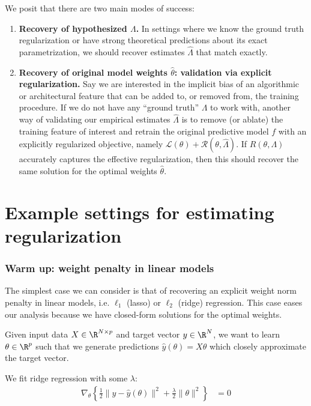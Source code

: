 \documentclass[10pt]{article}
\begin{document}
We posit that there are two main modes of success:
\begin{enumerate}
    \item \textbf{Recovery of hypothesized $\Lambda$.} In settings where we know the ground truth regularization or have strong theoretical predictions about its exact parametrization, we should recover estimates $\hat{\Lambda}$ that match exactly.
    \item \textbf{Recovery of original model weights $\hat{\theta}$: validation via explicit regularization.} Say we are interested in the implicit bias of an algorithmic or architectural feature that can be added to, or removed from, the training procedure. If we do not have any ``ground truth'' $\Lambda$ to work with, another way of validating our empirical estimates $\hat{\Lambda}$ is to remove (or ablate) the training feature of interest and retrain the original predictive model $f$ with an explicitly regularized objective, namely $\mathcal{L}(\theta) + \mathcal{R}(\theta, \hat{\Lambda})$. If $R(\theta, \Lambda)$ accurately captures the effective regularization, then this should recover the same solution for the optimal weights $\hat{\theta}$. 
\end{enumerate}

\section{Example settings for estimating regularization}
\subsubsection{Warm up: weight penalty in linear models}
The simplest case we can consider is that of recovering an explicit weight norm penalty in linear models, i.e. $\ell_1$ (lasso) or $\ell_2$ (ridge) regression. This case eases our analysis because we have closed-form solutions for the optimal weights. 

Given input data $X \in \R^{N \times p}$ and target vector $y \in \R^N$, we want to learn $\theta \in \R^p$ such that we generate predictions 
${\hat{y}}({\theta}) = X {\theta}$ which closely approximate the target vector. 

We fit ridge regression with some $\lambda$:
\begin{align*}
    \nabla_\theta \left\{ \frac{1}{2} \|{y} - {\hat{y}}({\theta})\|^2 + \frac{\lambda}{2}  \|\theta \|^2 \right\} &= 0 
\end{align*}
\end{document}
